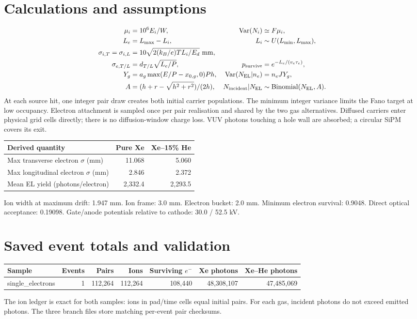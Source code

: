 \documentclass[11pt]{article}
\begin{document}
\section*{Calculations and assumptions}
\begin{align*}
\mu_i &= 10^6 E_i/W, &\operatorname{Var}(N_i)&\simeq F\mu_i,\\
L_e &= L_{\max}-L_i, & L_i&\sim U(L_{\min},L_{\max}),\\
\sigma_{i,T}=\sigma_{i,L}&=10\sqrt{2(k_B/e)TL_i/E_d}\ {\rm mm},\\
\sigma_{e,T/L}&=d_{T/L}\sqrt{L_e/P}, &p_{\rm survive}&=e^{-L_e/(v_e\tau_e)},\\
Y_g&=a_g\max(E/P-x_{0,g},0)Ph, &\operatorname{Var}(N_{\rm EL}|n_e)&=n_e JY_g,\\
A&=(h+r-\sqrt{h^2+r^2})/(2h), &N_{\rm incident}|N_{\rm EL}&\sim\mathrm{Binomial}(N_{\rm EL},A).
\end{align*}
At each source hit, one integer pair draw creates both initial carrier populations. The minimum integer variance limits the Fano target at low occupancy. Electron attachment is sampled once per pair realisation and shared by the two gas alternatives. Diffused carriers enter physical grid cells directly; there is no diffusion-window charge loss. VUV photons touching a hole wall are absorbed; a circular SiPM covers its exit.
\par\medskip
\begin{tabular}{lrr}\toprule Derived quantity & Pure Xe & Xe--15\% He\\\midrule
Max transverse electron $\sigma$ (mm) & 11.068 & 5.060\\
Max longitudinal electron $\sigma$ (mm) & 2.846 & 2.372\\
Mean EL yield (photons/electron) & 2,332.4 & 2,293.5\\
\bottomrule\end{tabular}
\par Ion width at maximum drift: 1.947 mm. Ion frame: 3.0 mm. Electron bucket: 2.0 mm. Minimum electron survival: 0.9048. Direct optical acceptance: 0.19098. Gate/anode potentials relative to cathode: 30.0 / 52.5 kV.
\section*{Saved event totals and validation}
\begin{tabular}{lrrrrrr}\toprule Sample & Events & Pairs & Ions & Surviving $e^-$ & Xe photons & Xe--He photons\\\midrule
single\_electrons & 1 & 112,264 & 112,264 & 108,440 & 48,308,107 & 47,485,069\\
\bottomrule\end{tabular}
\par The ion ledger is exact for both samples: ions in pad/time cells equal initial pairs. For each gas, incident photons do not exceed emitted photons. The three branch files store matching per-event pair checksums.
\end{document}
